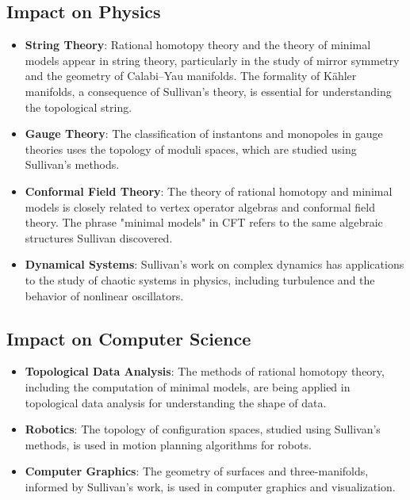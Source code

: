 \subsection{Impact on Physics}

\begin{itemize}
\item \textbf{String Theory}: Rational homotopy theory and the theory of minimal models appear in string theory, particularly in the study of mirror symmetry and the geometry of Calabi--Yau manifolds. The formality of K\"ahler manifolds, a consequence of Sullivan's theory, is essential for understanding the topological string.

\item \textbf{Gauge Theory}: The classification of instantons and monopoles in gauge theories uses the topology of moduli spaces, which are studied using Sullivan's methods.

\item \textbf{Conformal Field Theory}: The theory of rational homotopy and minimal models is closely related to vertex operator algebras and conformal field theory. The phrase "minimal models" in CFT refers to the same algebraic structures Sullivan discovered.

\item \textbf{Dynamical Systems}: Sullivan's work on complex dynamics has applications to the study of chaotic systems in physics, including turbulence and the behavior of nonlinear oscillators.
\end{itemize}

\subsection{Impact on Computer Science}

\begin{itemize}
\item \textbf{Topological Data Analysis}: The methods of rational homotopy theory, including the computation of minimal models, are being applied in topological data analysis for understanding the shape of data.

\item \textbf{Robotics}: The topology of configuration spaces, studied using Sullivan's methods, is used in motion planning algorithms for robots.

\item \textbf{Computer Graphics}: The geometry of surfaces and three-manifolds, informed by Sullivan's work, is used in computer graphics and visualization.
\end{itemize}

